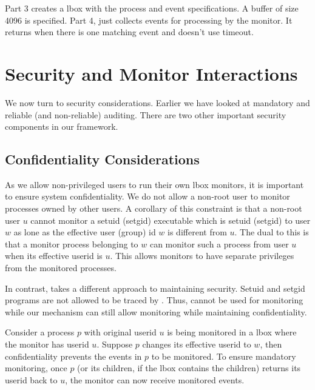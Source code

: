 Part 3 creates a lbox with the process and event specifications.
A buffer of size 4096 is specified.
Part 4, just collects events for processing by the monitor.
It returns when there is one matching event and doesn't use timeout.



\section{Security and Monitor Interactions}

We now turn to security considerations. Earlier we have looked
at mandatory and reliable (and non-reliable) auditing.
There are two other important security components in our framework.

\subsection{Confidentiality Considerations}
As we allow non-privileged users to run their own lbox monitors,
it is important to ensure system confidentiality. 
We do not allow a non-root user to monitor processes owned by other users.
A corollary of this constraint is that
a non-root user $u$ cannot monitor a setuid (setgid) executable
which is setuid (setgid) to user $w$ as lone as the effective user (group) id
$w$ is different from $u$.
The dual to this is that a monitor process belonging to $w$ can monitor
such a process from user $u$ when its effective userid is $u$.
This allows monitors to have separate privileges from the monitored
processes.

In contrast,  takes a different approach to maintaining
security.
Setuid and setgid programs are not allowed to be traced by .
Thus,  cannot be used for monitoring while our mechanism can
still allow monitoring while maintaining confidentiality.

Consider a process $p$ with original userid $u$ is being monitored in a lbox
where the monitor has userid $u$.
Suppose $p$ changes its effective userid to $w$, then confidentiality
prevents the events in $p$ to be monitored.
To ensure mandatory monitoring, once $p$ (or its children, if the
lbox contains the children) returns its userid back to $u$, the monitor
can now receive monitored events.

